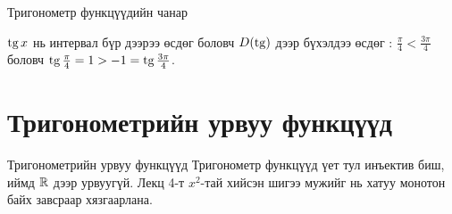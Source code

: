 \begin{frame}[allowframebreaks]{Тригонометр функцүүдийн чанар}
\begin{remark}
$\operatorname{tg} x$ нь интервал бүр дээрээ өсдөг боловч $D(\operatorname{tg})$ дээр бүхэлдээ өсдөг :
$\frac{\pi}{4}<\frac{3\pi}{4}$ боловч $\operatorname{tg}\frac{\pi}{4}=1>-1=\operatorname{tg}\frac{3\pi}{4}$.
\end{remark}
\end{frame}

\section{Тригонометрийн урвуу функцүүд}
\begin{frame}[allowframebreaks]{Тригонометрийн урвуу функцүүд}
Тригонометр функцүүд үет тул инъектив биш, иймд $\mathbb{R}$ дээр урвуугүй. Лекц 4-т
$x^2$-тай хийсэн шигээ мужийг нь хатуу монотон байх завсраар хязгаарлана.
\end{frame}

